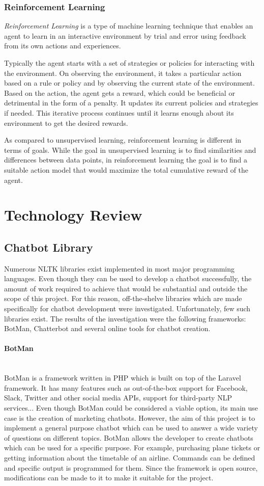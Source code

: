 \documentclass[12pt,a4paper]{article}
\newcommand{\myparagraph}[1]{\paragraph{#1}\mbox{}\\}
\begin{document}
\subsubsection{Reinforcement Learning}
\textit{Reinforcement Learning} is a type of machine learning technique that enables an agent to learn in an interactive environment by trial and error using feedback from its own actions and experiences.

Typically the agent starts with a set of strategies or policies for interacting with the environment. On observing the environment, it takes a particular action based on a rule or policy and by observing the current state of the environment. Based on the action, the agent gets a reward, which could be beneficial or detrimental in the form of a penalty. It updates its current policies and strategies if needed. This iterative process continues until it learns enough about its environment to get the desired rewards.

As compared to unsupervised learning, reinforcement learning is different in terms of goals. While the goal in unsupervised learning is to find similarities and differences between data points, in reinforcement learning the goal is to find a suitable action model that would maximize the total cumulative reward of the agent.

\newpage
\section{Technology Review}
\subsection{Chatbot Library}
Numerous NLTK libraries exist implemented in most major programming languages. Even though they can be used to develop a chatbot successfully, the amount of work required to achieve that would be substantial and outside the scope of this project. For this reason, off-the-shelve libraries which are made specifically for chatbot development were investigated. Unfortunately, few such libraries exist. The results of the investigation were the following frameworks: BotMan, Chatterbot and several online tools for chatbot creation.

\myparagraph{BotMan}
BotMan is a framework written in PHP which is built on top of the Laravel framework. It has many features such as out-of-the-box support for Facebook, Slack, Twitter and other social media APIs, support for third-party NLP services... Even though BotMan could be considered a viable option, its main use case is the creation of marketing chatbots. However, the aim of this project is to implement a general purpose chatbot which can be used to answer a wide variety of questions on different topics. BotMan allows the developer to create chatbots which can be used for a specific purpose. For example, purchasing plane tickets or getting information about the timetable of an airline. Commands can be defined and specific output is programmed for them. Since the framework is open source, modifications can be made to it to make it suitable for the project.
\end{document}
